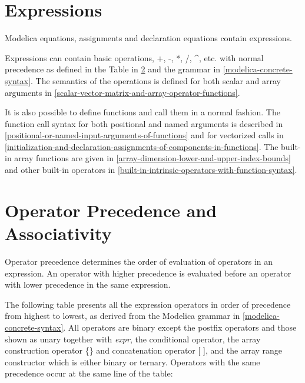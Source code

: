 \documentclass[10pt,a4paper]{report}
\def\doublelabel#1{\label{#1}}
\begin{document}
\section{Expressions}\doublelabel{expressions}

Modelica equations, assignments and declaration equations contain
expressions.

Expressions can contain basic operations, +, -, *, /, \^{}, etc. with
normal precedence as defined in the Table in \ref{operator-precedence-and-associativity} and the grammar
in \ref{modelica-concrete-syntax}. The semantics of the operations is defined for both
scalar and array arguments in \ref{scalar-vector-matrix-and-array-operator-functions}.

It is also possible to define functions and call them in a normal
fashion. The function call syntax for both positional and named
arguments is described in \ref{positional-or-named-input-arguments-of-functions} and for vectorized calls in
\ref{initialization-and-declaration-assignments-of-components-in-functions}. The built-in array functions are given in \ref{array-dimension-lower-and-upper-index-bounds}
and other built-in operators in \ref{built-in-intrinsic-operators-with-function-syntax}.

\section{Operator Precedence and Associativity}\doublelabel{operator-precedence-and-associativity}

Operator precedence determines the order of evaluation of operators in
an expression. An operator with higher precedence is evaluated before an
operator with lower precedence in the same expression.

The following table presents all the expression operators in order of
precedence from highest to lowest, as derived from the Modelica grammar
in \ref{modelica-concrete-syntax}. All operators are binary except the postfix operators and
those shown as unary together with \emph{expr}, the conditional
operator, the array construction operator \{\} and concatenation
operator {[} {]}, and the array range constructor which is either binary
  or ternary. Operators with the same precedence occur at the same line of
the table:
\end{document}
